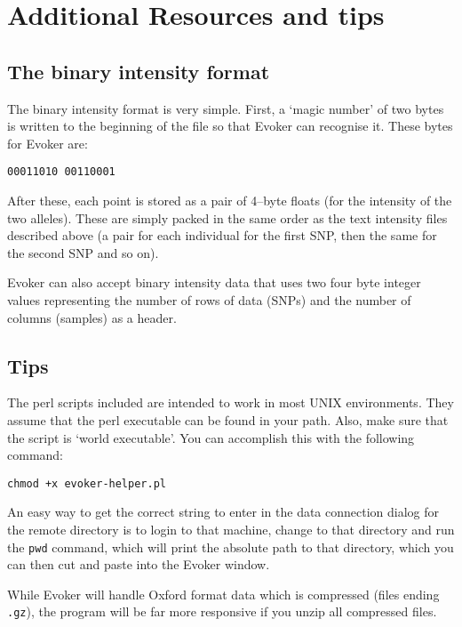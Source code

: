 \documentclass{article}
\begin{document}
\section{Additional Resources and tips}

\subsection{The binary intensity format}

The binary intensity format is very simple. First, a `magic number' of two bytes is written to the beginning of the file so that Evoker can recognise it. These bytes for Evoker are:
\begin{verbatim}
00011010 00110001
\end{verbatim}

\noindent After these, each point is stored as a pair of 4--byte floats (for the intensity of the two alleles). These are simply packed in the same order as the text intensity files described above (a pair for each individual for the first SNP, then the same for the second SNP and so on).

Evoker can also accept binary intensity data that uses two four byte integer values representing the number of rows of data (SNPs) and the number of columns (samples) as a header.

\subsection{Tips}

The perl scripts included are intended to work in most UNIX environments. They assume that the perl executable can be found in your path.  Also, make sure that the script is `world executable'. You can accomplish this with the following command: 

\begin{verbatim}
chmod +x evoker-helper.pl
\end{verbatim}

\noindent An easy way to get the correct string to enter in the data connection dialog for the remote directory is to login to that machine, change to that directory and run the \texttt{pwd} command, which will print the absolute path to that directory, which you can then cut and paste into the Evoker window.

\noindent While Evoker will handle Oxford format data which is compressed (files ending \texttt{.gz}), the program will be far more responsive if you unzip all compressed files.
\end{document}

